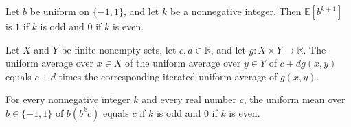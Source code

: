 \begin{theorem}
\label{FABL.expect_signValue_pow_succ}
\leanok
{}
Let $b$ be uniform on $\{-1,1\}$, and let $k$ be a nonnegative integer. Then
$\mathbb{E}[b^{k+1}]$ is $1$ if $k$ is odd and $0$ if $k$ is even.
\end{theorem}

\begin{theorem}
\label{FABL.expect_expect_affine}
\leanok
{}
Let $X$ and $Y$ be finite nonempty sets, let $c,d\in\mathbb R$, and let $g:X\times
Y\to\mathbb R$. The uniform average over $x\in X$ of the uniform average over $y\in Y$
of $c+d g(x,y)$ equals $c+d$ times the corresponding iterated uniform average of
$g(x,y)$.
\end{theorem}

\begin{theorem}
\label{FABL.expect_signValue_mul_power}
\leanok
{}
For every nonnegative integer $k$ and every real number $c$, the uniform mean over
$b\in\{−1,1\}$ of $b(b^k c)$ equals $c$ if $k$ is odd and $0$ if $k$ is even.
\end{theorem}

